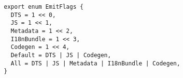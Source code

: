 \begin{verbatim}
export enum EmitFlags {
  DTS = 1 << 0,
  JS = 1 << 1,
  Metadata = 1 << 2,
  I18nBundle = 1 << 3,
  Codegen = 1 << 4,
  Default = DTS | JS | Codegen,
  All = DTS | JS | Metadata | I18nBundle | Codegen,
}
\end{verbatim}
